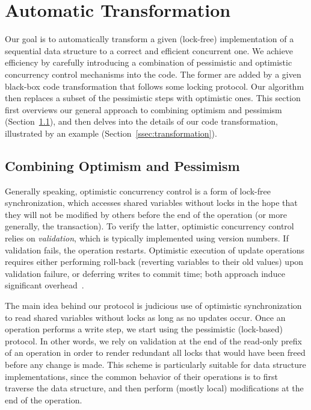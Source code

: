 \section{Automatic Transformation}\label{sec:algorithm}

Our goal is to automatically transform a given (lock-free) implementation of a sequential data structure to a correct and efficient concurrent one.
We achieve efficiency by carefully introducing a combination of pessimistic and optimistic concurrency control mechanisms into the code. The former are 
added by a given black-box code transformation that follows some locking protocol. Our algorithm then replaces a subset of the pessimistic
steps with optimistic ones. This section first overviews our general approach to combining optimism and pessimism (Section~\ref{ssec:overview}), and
then delves into the details of our code transformation, illustrated by an example (Section~\ref{ssec:transformation}).

\subsection{Combining Optimism and Pessimism}\label{ssec:overview}

Generally speaking, optimistic concurrency control is a form of lock-free synchronization, which accesses shared variables without locks in the hope that they will not be modified by others before the end of the operation (or more generally, the transaction). To verify the latter, optimistic concurrency control relies on \emph{validation}, which is typically implemented using version numbers. If validation fails, the operation restarts. Optimistic execution of update operations requires either performing roll-back (reverting variables to their old values) upon validation failure, or deferring writes to commit time; both approach induce significant overhead~\cite{Cascaval:2008}. 


The main idea behind our protocol is judicious use of optimistic synchronization to read 
shared variables without locks as long as no updates occur. Once an operation
performs a write step, we start using the pessimistic (lock-based) protocol. In
other words, we rely on validation at the end of the read-only prefix of an operation in order to render redundant all locks that would have been freed
before any change is made.
This scheme is particularly suitable for data structure implementations,
since the common behavior of their operations 
is to first traverse the data structure, and then 
perform (mostly local) modifications at the end of the operation.


